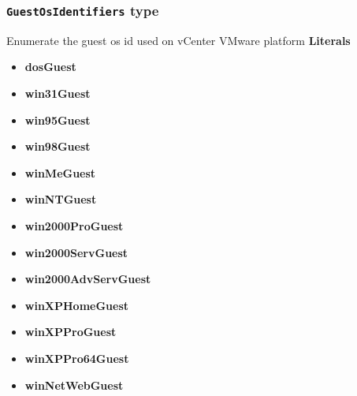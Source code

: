 \subsubsection{\texttt{GuestOsIdentifiers} type}
Enumerate the guest os id used on vCenter VMware platform
\textbf{Literals}
\begin{itemize}
\item \textbf{dosGuest} 
\end{itemize}
\begin{itemize}
\item \textbf{win31Guest} 
\end{itemize}
\begin{itemize}
\item \textbf{win95Guest} 
\end{itemize}
\begin{itemize}
\item \textbf{win98Guest} 
\end{itemize}
\begin{itemize}
\item \textbf{winMeGuest} 
\end{itemize}
\begin{itemize}
\item \textbf{winNTGuest} 
\end{itemize}
\begin{itemize}
\item \textbf{win2000ProGuest} 
\end{itemize}
\begin{itemize}
\item \textbf{win2000ServGuest} 
\end{itemize}
\begin{itemize}
\item \textbf{win2000AdvServGuest} 
\end{itemize}
\begin{itemize}
\item \textbf{winXPHomeGuest} 
\end{itemize}
\begin{itemize}
\item \textbf{winXPProGuest} 
\end{itemize}
\begin{itemize}
\item \textbf{winXPPro64Guest} 
\end{itemize}
\begin{itemize}
\item \textbf{winNetWebGuest} 
\end{itemize}
